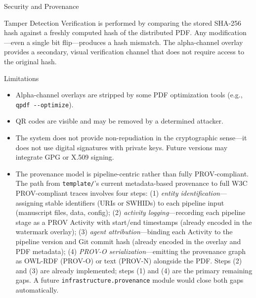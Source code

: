 \documentclass[
  ignorenonframetext,
]{beamer}
\providecommand{\tightlist}{%
  \setlength{\itemsep}{0pt}\setlength{\parskip}{0pt}}
\begin{document}
\begin{frame}[fragile]{Security and Provenance}
\begin{block}{Tamper Detection}
\protect{}\label{tamper-detection}
Verification is performed by comparing the stored SHA-256 hash against a
freshly computed hash of the distributed PDF. Any modification---even a
single bit flip---produces a hash mismatch. The alpha-channel overlay
provides a secondary, visual verification channel that does not require
access to the original hash.
\end{block}

\begin{block}{Limitations}
\protect{}\label{limitations}
\begin{itemize}
\tightlist
\item
  Alpha-channel overlays are stripped by some PDF optimization tools
  (e.g., \texttt{qpdf\ -\/-optimize}).
\item
  QR codes are visible and may be removed by a determined attacker.
\item
  The system does not provide non-repudiation in the cryptographic
  sense---it does not use digital signatures with private keys. Future
  versions may integrate GPG or X.509 signing.
\item
  The provenance model is pipeline-centric rather than fully
  PROV-compliant. The path from \texttt{template/}'s current
  metadata-based provenance to full W3C PROV-compliant traces involves
  four steps: (1) \emph{entity identification}---assigning stable
  identifiers (URIs or SWHIDs) to each pipeline input (manuscript files,
  data, config); (2) \emph{activity logging}---recording each pipeline
  stage as a PROV Activity with start/end timestamps (already encoded in
  the watermark overlay); (3) \emph{agent attribution}---binding each
  Activity to the pipeline version and Git commit hash (already encoded
  in the overlay and PDF metadata); (4) \emph{PROV-O
  serialization}---emitting the provenance graph as OWL-RDF (PROV-O) or
  text (PROV-N) alongside the PDF. Steps (2) and (3) are already
  implemented; steps (1) and (4) are the primary remaining gaps. A
  future \texttt{infrastructure.provenance} module would close both gaps
  automatically.
\end{itemize}
\end{block}


\end{frame}
\end{document}
